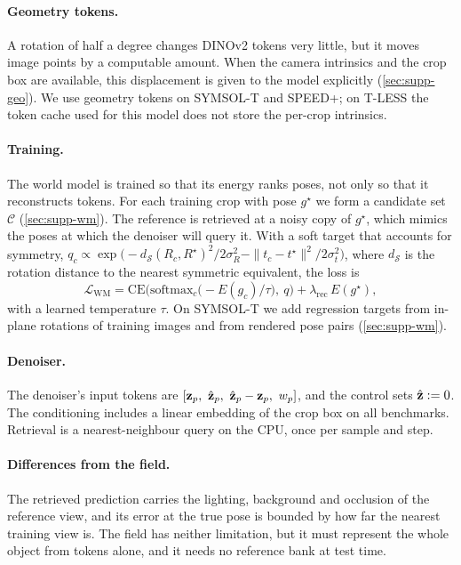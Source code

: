 \paragraph{Geometry tokens.}
A rotation of half a degree changes DINOv2 tokens very little, but it moves image points by a computable amount. When the camera
intrinsics and the crop box are available, this displacement is given to the model explicitly (\cref{sec:supp-geo}). We use geometry
tokens on SYMSOL-T and SPEED+; on T-LESS the token cache used for this model does not store the per-crop intrinsics.

\paragraph{Training.}
The world model is trained so that its energy ranks poses, not only so that it reconstructs tokens. For each training crop with pose
$g^\star$ we form a candidate set $\mathcal{C}$ (\cref{sec:supp-wm}). The reference is retrieved at a noisy copy of $g^\star$, which
mimics the poses at which the denoiser will query it. With a soft target that accounts for symmetry,
$q_c \propto \exp\!\big(-d_{\mathcal{S}}(R_c,R^\star)^2/2\sigma_R^2-\|t_c-t^\star\|^2/2\sigma_t^2\big)$, where $d_{\mathcal{S}}$ is the rotation
distance to the nearest symmetric equivalent, the loss is
\begin{equation}
\mathcal{L}_{\mathrm{WM}} = \mathrm{CE}\Big(\mathrm{softmax}_c\big(-E(g_c)/\tau\big),\ q\Big) + \lambda_{\mathrm{rec}}\,E(g^\star),
\label{eq:wmloss}
\end{equation}
with a learned temperature $\tau$. On SYMSOL-T we add regression targets from in-plane rotations of training images and from rendered pose
pairs (\cref{sec:supp-wm}).

\paragraph{Denoiser.}
The denoiser's input tokens are $[\zobs_p,\ \zhat_p,\ \zhat_p-\zobs_p,\ w_p]$, and the control sets $\hat{\mathbf{z}}:=0$. The conditioning includes a
linear embedding of the crop box on all benchmarks. Retrieval is a nearest-neighbour query on the CPU, once per sample and step.

\paragraph{Differences from the field.}
The retrieved prediction carries the lighting, background and occlusion of the reference view, and its error at the true pose is
bounded by how far the nearest training view is. The field has neither limitation, but it must represent the whole object from tokens
alone, and it needs no reference bank at test time.

